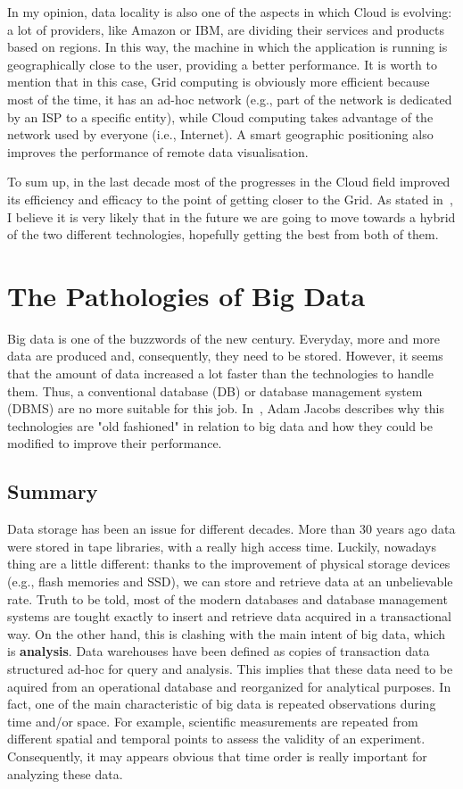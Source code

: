 \documentclass[a4paper]{IEEEtran}
\begin{document}
In my opinion, data locality is also one of the aspects in which Cloud is evolving: a lot of providers, like Amazon or IBM, are dividing their services and products based on regions. In this way, the machine in which the application is running is geographically close to the user, providing a better performance. It is worth to mention that in this case, Grid computing is obviously more efficient because most of the time, it has an ad-hoc network (e.g., part of the network is dedicated by an ISP to a specific entity), while Cloud computing takes advantage of the network used by everyone (i.e., Internet). A smart geographic positioning also improves the performance of remote data visualisation.

To sum up, in the last decade most of the progresses in the Cloud field improved its efficiency and efficacy to the point of getting closer to the Grid. As stated in~\cite{CloudGrid}, I believe it is very likely that in the future we are going to move towards a hybrid of the two different technologies, hopefully getting the best from both of them.

\section{The Pathologies of Big Data}

Big data is one of the buzzwords of the new century. Everyday, more and more data are produced and, consequently, they need to be stored. However, it seems that the amount of data increased a lot faster than the technologies to handle them. Thus, a conventional database (DB) or database management system (DBMS) are no more suitable for this job. In~\cite{BigData}, Adam Jacobs describes why this technologies are "old fashioned" in relation to big data and how they could be modified to improve their performance.

\subsection{Summary}

Data storage has been an issue for different decades. More than 30 years ago data were stored in tape libraries, with a really high access time. Luckily, nowadays thing are a little different: thanks to the improvement of physical storage devices (e.g., flash memories and SSD), we can store and retrieve data at an unbelievable rate. Truth to be told, most of the modern databases and database management systems are tought exactly to insert and retrieve data acquired in a transactional way. On the other hand, this is clashing with the main intent of big data, which is \textbf{analysis}. Data warehouses have been defined as copies of transaction data structured ad-hoc for query and analysis. This implies that these data need to be aquired from an operational database and reorganized for analytical purposes.
In fact, one of the main characteristic of big data is repeated observations during time and/or space. For example, scientific measurements are repeated from different spatial and temporal points to assess the validity of an experiment. Consequently, it may appears obvious that time order is really important for analyzing these data.
\end{document}
